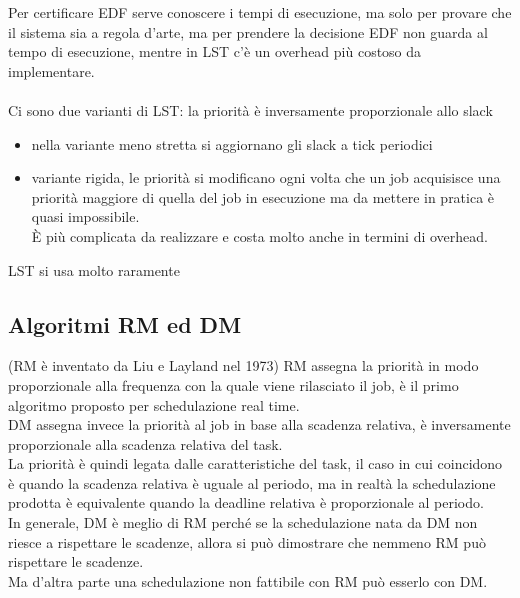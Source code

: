 \documentclass[12pt, oneside]{extbook}
\begin{document}
Per certificare EDF serve conoscere i tempi di esecuzione, ma solo per provare che il sistema sia a regola d'arte, ma per prendere la decisione EDF non guarda al tempo di esecuzione, mentre in LST c'è un overhead più costoso da implementare.\\\\Ci sono due varianti di LST: la priorità è inversamente proporzionale allo slack
\begin{itemize}
	\item nella variante meno stretta si aggiornano gli slack a tick periodici
	\item variante rigida, le priorità si modificano ogni volta che un job acquisisce una priorità maggiore di quella del job in esecuzione ma da mettere in pratica è quasi impossibile.\\
	È più complicata da realizzare e costa molto anche in termini di overhead.
\end{itemize}
LST si usa molto raramente

\subsection{Algoritmi RM ed DM}
(RM è inventato da Liu e Layland nel 1973) RM assegna la priorità in modo proporzionale alla frequenza con la quale viene rilasciato il job, è il primo algoritmo proposto per schedulazione real time.\\
DM assegna invece la priorità al job in base alla scadenza relativa, è inversamente proporzionale alla scadenza relativa del task.\\
La priorità è quindi legata dalle caratteristiche del task, il caso in cui coincidono è quando la scadenza relativa è uguale al periodo, ma in realtà la schedulazione prodotta è equivalente quando la deadline relativa è proporzionale al periodo.\\
In generale, DM è meglio di RM perché se la schedulazione nata da DM non riesce a rispettare le scadenze, allora si può dimostrare che nemmeno RM può rispettare le scadenze.\\
Ma d'altra parte una schedulazione non fattibile con RM può esserlo con DM.
\end{document}
